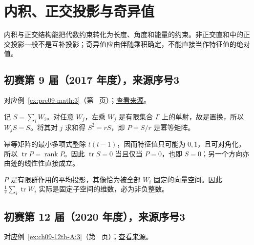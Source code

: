 \documentclass[UTF8,12pt,a4paper,fontset=fandol]{ctexart}
\begin{document}
\section{内积、正交投影与奇异值}

\label{sec:solutions-8}

内积与正交结构能把代数约束转化为长度、角度和能量的约束。非正交直和中的正交投影一般不是互补投影；奇异值应由伴随乘积确定，不能直接当作特征值的绝对值。

\subsection{初赛第 9 届（2017 年度），来源序号3}\label{ans:pre09-math:3}\label{pr:pre09-math:3}

对应例~\ref{ex:pre09-math:3}（第~\pageref{ex:pre09-math:3} 页）；\href{https://github.com/lzxcr/cmc-mathematics/blob/64916fa1fdbc3e444a652eca204d5669058ee321/src/problems/preliminary/09/03.md}{查看来源}。

\begin{solve}

记 $S=\sum_iW_i$。对任意 $W_j$，左乘 $W_j$ 是有限集合 $\Gamma$ 上的单射，故是置换，所以 $W_jS=S$。将其对 $j$ 求和得 $S^2=rS$，即 $P=S/r$ 是幂等矩阵。

幂等矩阵的最小多项式整除 $t(t-1)$，因而特征值只可能为 $0,1$，且可对角化，所以 $\operatorname{tr}P=\operatorname{rank}P$。因此 $\operatorname{tr}S=0$ 当且仅当 $P=0$，也即 $S=0$；另一个方向亦由迹的线性性直接成立。

\end{solve}

\begin{remark}[方法与条件]

$P$ 是有限群作用的平均投影，其像恰为被全部 $W_i$ 固定的向量空间。因此 $\frac1r\sum_i\operatorname{tr}W_i$ 实际是固定子空间的维数，必为非负整数。

\end{remark}

\subsection{初赛第 12 届（2020 年度），来源序号3}\label{ans:ch09-12th-A:3}\label{pr:ch09-12th-A:3}

对应例~\ref{ex:ch09-12th-A:3}（第~\pageref{ex:ch09-12th-A:3} 页）；\href{https://github.com/lzxcr/cmc-mathematics/blob/64916fa1fdbc3e444a652eca204d5669058ee321/src/problems/preliminary/12/03.md}{查看来源}。
\end{document}
